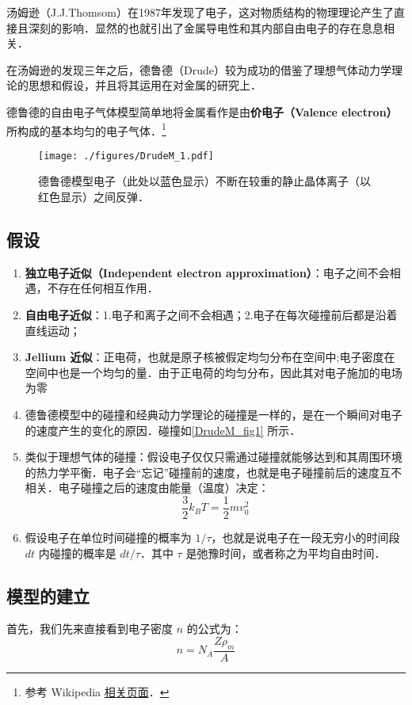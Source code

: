 
汤姆逊（J.J.Thomsom）在1987年发现了电子，这对物质结构的物理理论产生了直接且深刻的影响．显然的也就引出了金属导电性和其内部自由电子的存在息息相关．

在汤姆逊的发现三年之后，德鲁德（Drude）较为成功的借鉴了理想气体动力学理论的思想和假设，并且将其运用在对金属的研究上．

德鲁德的自由电子气体模型简单地将金属看作是由\textbf{价电子（Valence electron）}所构成的基本均匀的电子气体．\footnote{参考 Wikipedia \href{https://en.wikipedia.org/wiki/Drude_model}{相关页面}．}
\begin{figure}[ht]
\centering
\texttt{[image: ./figures/DrudeM\_1.pdf]}
\caption{德鲁德模型电子（此处以蓝色显示）不断在较重的静止晶体离子（以红色显示）之间反弹．} \label{DrudeM_fig1}
\end{figure}
\subsection{假设}
\begin{enumerate}
\item \textbf{独立电子近似（Independent electron approximation）}：电子之间不会相遇，不存在任何相互作用．
\item \textbf{自由电子近似}：1.电子和离子之间不会相遇；2.电子在每次碰撞前后都是沿着直线运动；
\item \textbf{Jellium 近似}：正电荷，也就是原子核被假定均匀分布在空间中;电子密度在空间中也是一个均匀的量．由于正电荷的均匀分布，因此其对电子施加的电场为零
\item 德鲁德模型中的碰撞和经典动力学理论的碰撞是一样的，是在一个瞬间对电子的速度产生的变化的原因．碰撞如\autoref{DrudeM_fig1} 所示．
\item 类似于理想气体的碰撞：假设电子仅仅只需通过碰撞就能够达到和其周围环境的热力学平衡．电子会“忘记”碰撞前的速度，也就是电子碰撞前后的速度互不相关．电子碰撞之后的速度由能量（温度）决定：
\begin{equation}
\frac{3}{2}k_BT = \frac{1}{2}mv_0^2
\end{equation}
\item 假设电子在单位时间碰撞的概率为 $1/\tau $，也就是说电子在一段无穷小的时间段 $dt$ 内碰撞的概率是 $dt/\tau$．其中 $\tau$ 是弛豫时间，或者称之为平均自由时间．
\end{enumerate}
\subsection{模型的建立}
首先，我们先来直接看到电子密度 $n$ 的公式为：
\begin{equation}
n=N_A\frac{Z\rho_m}{A}
\end{equation}


